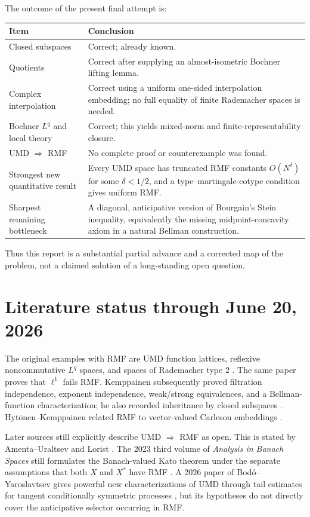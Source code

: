 \documentclass[11pt]{article}
\theoremstyle{definition}
\newcommand{\1}{\mathbf 1}
\begin{document}
The outcome of the present final attempt is:
\begin{center}
\begin{tabular}{p{}p{}}
\toprule
Item & Conclusion \\
\midrule
Closed subspaces & Correct; already known. \\
Quotients & Correct after supplying an almost-isometric Bochner lifting lemma. \\
Complex interpolation & Correct using a uniform one-sided interpolation embedding; no full equality of finite Rademacher spaces is needed. \\
Bochner $L^q$ and local theory & Correct; this yields mixed-norm and finite-representability closure. \\
UMD $\Rightarrow$ RMF & No complete proof or counterexample was found. \\
Strongest new quantitative result & Every UMD space has truncated RMF constants $O(N^\delta)$ for some $\delta<1/2$, and a type--martingale-cotype condition gives uniform RMF. \\
Sharpest remaining bottleneck & A diagonal, anticipative version of Bourgain's Stein inequality, equivalently the missing midpoint-concavity axiom in a natural Bellman construction. \\
\bottomrule
\end{tabular}
\end{center}

Thus this report is a substantial partial advance and a corrected map of the
problem, not a claimed solution of a long-standing open question.

\section{Literature status through June 20, 2026}

The original examples with RMF are UMD function lattices, reflexive
noncommutative $L^q$ spaces, and spaces of Rademacher type $2$
\cite[Proposition 2.13]{HMP}.  The same paper proves that $\ell^1$ fails RMF.
Kemppainen subsequently proved filtration independence, exponent independence,
weak/strong equivalences, and a Bellman-function characterization; he also
recorded inheritance by closed subspaces \cite{Kemppainen2011}.
Hyt\"onen--Kemppainen related RMF to vector-valued Carleson embeddings
\cite{HK2011}.

Later sources still explicitly describe UMD $\Rightarrow$ RMF as open.  This
is stated by Amenta--Uraltsev \cite{AmentaUraltsev2020} and Lorist
\cite{Lorist2021}.  The 2023 third volume of \emph{Analysis in Banach Spaces}
still formulates the Banach-valued Kato theorem under the separate assumptions
that both $X$ and $X^*$ have RMF \cite{HNVW2023}.  A 2026 paper of
Bod\'o--Yaroslavtsev gives powerful new characterizations of UMD through tail
estimates for tangent conditionally symmetric processes
\cite{BodoYaroslavtsev2026}, but its hypotheses do not directly cover the
anticipative selector occurring in RMF.
\end{document}
